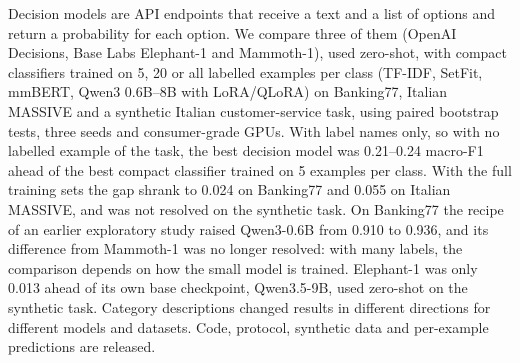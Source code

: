 Decision models are API endpoints that receive a text and a list of options and return a probability for each option. We compare
three of them (OpenAI Decisions, Base Labs Elephant-1 and Mammoth-1), used zero-shot, with compact classifiers trained on 5, 20 or all
labelled examples per class (TF-IDF, SetFit, mmBERT, Qwen3 0.6B--8B with LoRA/QLoRA) on Banking77, Italian MASSIVE and a synthetic Italian
customer-service task, using paired bootstrap tests, three seeds and consumer-grade GPUs. With label names only, so with no labelled
example of the task, the best decision model was 0.21--0.24 macro-F1 ahead of the best compact classifier trained on 5 examples per
class. With the full training sets the gap shrank to 0.024 on Banking77 and 0.055 on Italian MASSIVE, and was not resolved on the synthetic
task. On Banking77 the recipe of an earlier exploratory study raised Qwen3-0.6B from 0.910 to 0.936, and its difference from Mammoth-1 was
no longer resolved: with many labels, the comparison depends on how the small model is trained. Elephant-1 was only 0.013 ahead of its own
base checkpoint, Qwen3.5-9B, used zero-shot on the synthetic task. Category descriptions changed results in different directions for
different models and datasets. Code, protocol, synthetic data and per-example predictions are released.
